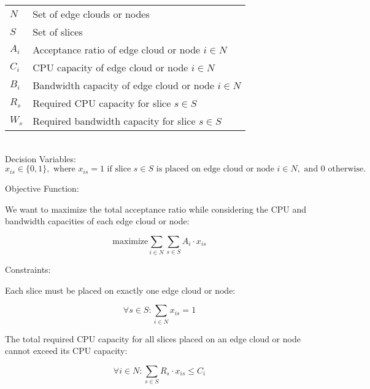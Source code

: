 \begin{tabular}{l l}
    $N$ & Set of edge clouds or nodes \\
    $S$ & Set of slices \\
    $A_i$ & Acceptance ratio of edge cloud or node $i \in N$ \\
    $C_i$ & CPU capacity of edge cloud or node $i \in N$ \\
    $B_i$ & Bandwidth capacity of edge cloud or node $i \in N$ \\
    $R_s$ & Required CPU capacity for slice $s \in S$ \\
    $W_s$ & Required bandwidth capacity for slice $s \in S$
\end{tabular}
\\
Decision Variables:
\\
\begin{equation*}
    x_{is} \in \{0, 1\}, \text{ where } x_{is} = 1 \text{ if slice } s \in S \text{ is placed on edge cloud or node } i \in N, \text{ and } 0 \text{ otherwise.}
\end{equation*}

Objective Function:

We want to maximize the total acceptance ratio while considering the CPU and bandwidth capacities of each edge cloud or node:

\begin{equation*}
    \text{maximize} \sum_{i \in N} \sum_{s \in S} A_i \cdot x_{is}
\end{equation*}

Constraints:

Each slice must be placed on exactly one edge cloud or node:

\begin{equation*}
    \forall s \in S: \sum_{i \in N} x_{is} = 1
\end{equation*}

The total required CPU capacity for all slices placed on an edge cloud or node cannot exceed its CPU capacity:

\begin{equation*}
    \forall i \in N: \sum_{s \in S} R_s \cdot x_{is} \leq C_i
\end{equation*}

